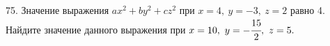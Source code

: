 75. Значение выражения $ax^2+by^2+cz^2$ при $x=4,\ y=-3,\ z=2$ равно 4. Найдите значение данного выражения при $x=10,\ y=-\cfrac{15}{2},\ z=5.$\\
